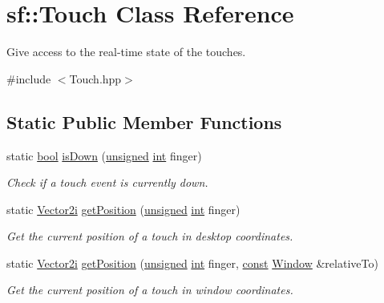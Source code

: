 \hypertarget{classsf_1_1_touch}{\section{sf\-:\-:Touch Class Reference}
\label{classsf_1_1_touch}
}


Give access to the real-\/time state of the touches.  




{\ttfamily \#include $<$Touch.\-hpp$>$}

\subsection*{Static Public Member Functions}
\begin{DoxyCompactItemize}
\item 
static \hyperlink{term__entry_8h_a002004ba5d663f149f6c38064926abac}{bool} \hyperlink{classsf_1_1_touch_a2f85297123ea4e401d02c346e50d48a3}{is\-Down} (\hyperlink{curses_8priv_8h_aca40206900cfc164654362fa8d4ad1e6}{unsigned} \hyperlink{term__entry_8h_ad65b480f8c8270356b45a9890f6499ae}{int} finger)
\begin{DoxyCompactList}\small\item\em Check if a touch event is currently down. \end{DoxyCompactList}\item 
static \hyperlink{namespacesf_a0eed58bf66694ebbc55f72ca7de840d9}{Vector2i} \hyperlink{classsf_1_1_touch_af1b7035be709091c7475075e43e2bc23}{get\-Position} (\hyperlink{curses_8priv_8h_aca40206900cfc164654362fa8d4ad1e6}{unsigned} \hyperlink{term__entry_8h_ad65b480f8c8270356b45a9890f6499ae}{int} finger)
\begin{DoxyCompactList}\small\item\em Get the current position of a touch in desktop coordinates. \end{DoxyCompactList}\item 
static \hyperlink{namespacesf_a0eed58bf66694ebbc55f72ca7de840d9}{Vector2i} \hyperlink{classsf_1_1_touch_a372acaba3c7ac70fca4614c16ac4a1bb}{get\-Position} (\hyperlink{curses_8priv_8h_aca40206900cfc164654362fa8d4ad1e6}{unsigned} \hyperlink{term__entry_8h_ad65b480f8c8270356b45a9890f6499ae}{int} finger, \hyperlink{term__entry_8h_a57bd63ce7f9a353488880e3de6692d5a}{const} \hyperlink{classsf_1_1_window}{Window} \&relative\-To)
\begin{DoxyCompactList}\small\item\em Get the current position of a touch in window coordinates. \end{DoxyCompactList}\item 

\end{DoxyCompactItemize}
